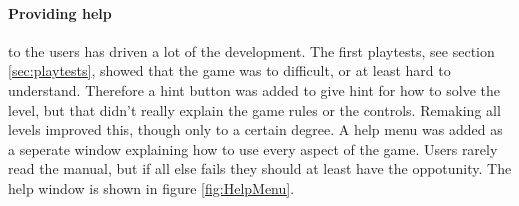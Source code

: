 \paragraph{Providing help} to the users has driven a lot of the development.
The first playtests, see section \ref{sec:playtests}, showed that the game was to difficult,
or at least hard to understand. Therefore a hint button was added to give
hint for how to solve the level, but that didn't really explain the game
rules or the controls. Remaking all levels improved this, though only to a
certain degree. A help menu was added as a seperate window explaining
how to use every aspect of the game. Users rarely read the manual, but if
all else fails they should at least have the oppotunity. The help window is
shown in figure \ref{fig:HelpMenu}.


